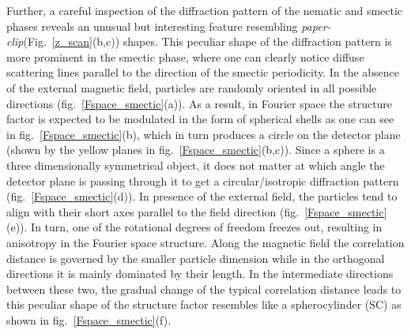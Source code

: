 \documentclass[aps,prl,preprint,superscriptaddress]{revtex4-1} %
\begin{document}
Further, a careful inspection of the diffraction pattern of the nematic and smectic phases reveals an unusual but interesting feature resembling \textit{paper-clip}(Fig.~\ref{z_scan}(b,c)) shapes. This peculiar shape of the diffraction pattern is more prominent in the smectic phase, where one can clearly notice diffuse scattering lines parallel to the direction of the smectic periodicity. In the absence of the external magnetic field, particles are randomly oriented in all possible directions (fig.~\ref{Fspace_smectic}(a)). As a result, in Fourier space the structure factor is expected to be modulated in the form of spherical shells as one can see in fig.~\ref{Fspace_smectic}(b), which in turn produces a circle on the detector plane (shown by the yellow planes in fig.~\ref{Fspace_smectic}(b,c)). Since a sphere is a three dimensionally symmetrical object, it does not matter at which angle the detector plane is passing through it to get a circular/isotropic diffraction pattern (fig.~\ref{Fspace_smectic}(d)). In presence of the external field, the particles tend to align with their short axes parallel to the field direction (fig.~\ref{Fspace_smectic}(e)). In turn, one of the rotational degrees of freedom freezes out, resulting in anisotropy in the Fourier space structure. Along the magnetic field the correlation distance is governed by the smaller particle dimension while in the orthogonal directions it is mainly dominated by their length. In the intermediate directions between these two, the gradual change of the typical correlation distance leads to this peculiar shape of the structure factor resembles like a spherocylinder (SC) as shown in fig.~\ref{Fspace_smectic}(f). %
\end{document}
